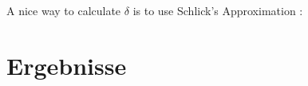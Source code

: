 \documentclass[11pt,a4paper]{article}
\begin{document}
A nice way to calculate $\delta$ is to use Schlick's Approximation \cite{Sch94}:



\newpage
\section{Ergebnisse}
\label{sec::Ergebnisse}


\newpage
{}


\end{document}
